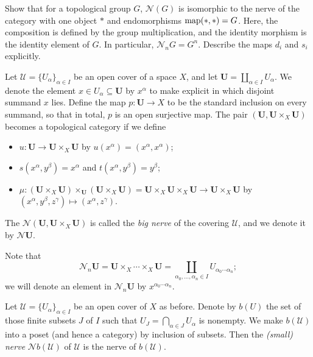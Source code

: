 \documentclass[a4paper,openany]{scrbook}
\newcommand{\nerve}{\mathcal N}
\begin{document}
\begin{exer}
Show that for a topological group $G$, $\nerve(G)$ is isomorphic to the nerve of the category with one object $*$ and endomorphisms $\operatorname{map}(*,*)=G$. Here, the composition is defined by the group multiplication, and the identity morphism is the identity element of $G$. In particular, $\nerve_nG = G^n$. Describe the maps $d_i$ and $s_i$ explicitly.
\end{exer}

\begin{example}
Let $\mathcal U = \{U_\alpha\}_{\alpha \in I}$ be an open cover of a space $X$, and let $\mathbf U = \coprod_{\alpha \in I} U_\alpha$. We denote the element $x \in U_\alpha \subseteq \mathbf U$ by $x^{\alpha}$ to make explicit in which disjoint summand $x$ lies. Define the map $p\colon \mathbf U \to X$ to be the standard inclusion on every summand, so that in total, $p$ is an open surjective map.
The pair $(\mathbf U,\mathbf U \times_X \mathbf U)$ becomes a topological category if we define
\begin{itemize}
\item $u\colon \mathbf U \to \mathbf U \times_X \mathbf U$ by $u(x^\alpha) = (x^\alpha,x^\alpha)$;
\item $s(x^\alpha,y^\beta) = x^\alpha$ and $t(x^\alpha,y^\beta) = y^\beta$;
\item $\mu\colon (\mathbf U \times_X \mathbf U) \times_{\mathbf U} (\mathbf U \times_X \mathbf U) = \mathbf U \times_X \mathbf U \times_X \mathbf U \to \mathbf U \times_X \mathbf U$ by $(x^\alpha,y^\beta,z^\gamma) \mapsto (x^\alpha,z^\gamma)$.
\end{itemize}
The $\nerve(\mathbf U,\mathbf U \times_X \mathbf U)$ is called the \emph{big nerve} of the covering $\mathcal U$, and we denote it by $\nerve\mathbf U$.
\end{example}

Note that
\[
\nerve_n\mathbf U = \mathbf U \times_X \cdots \times_X \mathbf U = \coprod_{\alpha_0,\dots,\alpha_n \in I} U_{\alpha_0\cdots\alpha_n};
\]
we will denote an element in $\nerve_n\mathbf U$ by $x^{\alpha_0\cdots\alpha_n}$.

\begin{example}
Let $\mathcal U = \{U_\alpha\}_{\alpha \in I}$ be an open cover of $X$ as before. Denote by $b(U)$ the set of those finite subsets $J$ of $I$ such that $U_J = \bigcap_{\alpha \in J} U_\alpha$ is nonempty. We make $b(\mathcal U)$ into a poset (and hence a category) by inclusion of subsets. Then the \emph{(small) nerve} $\nerve b(\mathcal U)$ of $\mathcal U$ is the nerve of $b(\mathcal U)$.
\end{example}
\end{document}

